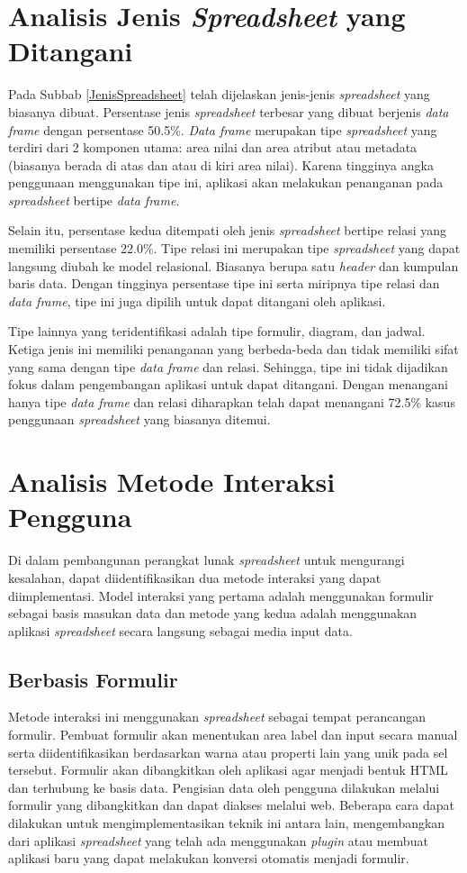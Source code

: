 \section{Analisis Jenis \textit{Spreadsheet} yang Ditangani}
Pada Subbab \ref{JenisSpreadsheet} telah dijelaskan jenis-jenis \textit{spreadsheet} yang biasanya dibuat. Persentase jenis \textit{spreadsheet} terbesar yang dibuat berjenis \textit{data frame} dengan persentase 50.5\%. \textit{Data frame} merupakan tipe \textit{spreadsheet} yang terdiri dari 2 komponen utama: area nilai dan area atribut atau metadata (biasanya berada di atas dan atau di kiri area nilai). Karena tingginya angka penggunaan menggunakan tipe ini, aplikasi akan melakukan penanganan pada \textit{spreadsheet} bertipe \textit{data frame}.

Selain itu, persentase kedua ditempati oleh jenis \textit{spreadsheet} bertipe relasi yang memiliki persentase 22.0\%. Tipe relasi ini merupakan tipe \textit{spreadsheet} yang dapat langsung diubah ke model relasional. Biasanya berupa satu \textit{header} dan kumpulan baris data. Dengan tingginya persentase tipe ini serta miripnya tipe relasi dan \textit{data frame}, tipe ini juga dipilih untuk dapat ditangani oleh aplikasi.

Tipe lainnya yang teridentifikasi adalah tipe formulir, diagram, dan jadwal. Ketiga jenis ini memiliki penanganan yang berbeda-beda dan tidak memiliki sifat yang sama dengan tipe \textit{data frame} dan relasi. Sehingga, tipe ini tidak dijadikan fokus dalam pengembangan aplikasi untuk dapat ditangani. Dengan menangani hanya tipe \textit{data frame} dan relasi diharapkan telah dapat menangani 72.5\% kasus penggunaan \textit{spreadsheet} yang biasanya ditemui.

\section{Analisis Metode Interaksi Pengguna}
Di dalam pembangunan perangkat lunak \textit{spreadsheet} untuk mengurangi kesalahan, dapat diidentifikasikan dua metode interaksi yang dapat diimplementasi. Model interaksi yang pertama adalah menggunakan formulir sebagai basis masukan data dan metode yang kedua adalah menggunakan aplikasi \textit{spreadsheet} secara langsung sebagai media input data.
	\subsection{Berbasis Formulir}
	Metode interaksi ini menggunakan \textit{spreadsheet} sebagai tempat perancangan formulir. Pembuat formulir akan menentukan area label dan input secara manual serta diidentifikasikan berdasarkan warna atau properti lain yang unik pada sel tersebut. Formulir akan dibangkitkan oleh aplikasi agar menjadi bentuk HTML dan terhubung ke basis data. Pengisian data oleh pengguna dilakukan melalui formulir yang dibangkitkan dan dapat diakses melalui web. Beberapa cara dapat dilakukan untuk mengimplementasikan teknik ini antara lain, mengembangkan dari aplikasi \textit{spreadsheet} yang telah ada menggunakan \textit{plugin} atau membuat aplikasi baru yang dapat melakukan konversi otomatis menjadi formulir.

